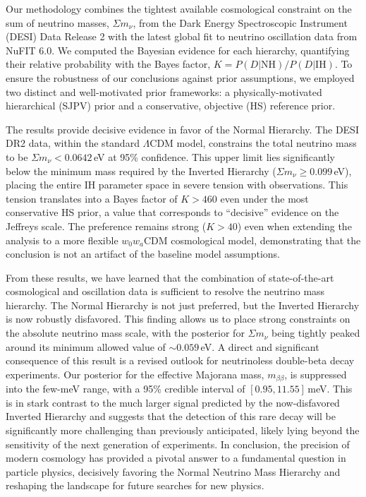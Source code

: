 \documentclass[]{article}
\begin{document}
Our methodology combines the tightest available cosmological constraint on the sum of neutrino masses, $\Sigma m_\nu$, from the Dark Energy Spectroscopic Instrument (DESI) Data Release 2 with the latest global fit to neutrino oscillation data from NuFIT 6.0. We computed the Bayesian evidence for each hierarchy, quantifying their relative probability with the Bayes factor, $K = P(D|\text{NH}) / P(D|\text{IH})$. To ensure the robustness of our conclusions against prior assumptions, we employed two distinct and well-motivated prior frameworks: a physically-motivated hierarchical (SJPV) prior and a conservative, objective (HS) reference prior.

The results provide decisive evidence in favor of the Normal Hierarchy. The DESI DR2 data, within the standard $\Lambda$CDM model, constrains the total neutrino mass to be $\Sigma m_\nu < 0.0642$\,eV at 95\% confidence. This upper limit lies significantly below the minimum mass required by the Inverted Hierarchy ($\Sigma m_\nu \ge 0.099$\,eV), placing the entire IH parameter space in severe tension with observations. This tension translates into a Bayes factor of $K > 460$ even under the most conservative HS prior, a value that corresponds to ``decisive'' evidence on the Jeffreys scale. The preference remains strong ($K > 40$) even when extending the analysis to a more flexible $w_0w_a$CDM cosmological model, demonstrating that the conclusion is not an artifact of the baseline model assumptions.

From these results, we have learned that the combination of state-of-the-art cosmological and oscillation data is sufficient to resolve the neutrino mass hierarchy. The Normal Hierarchy is not just preferred, but the Inverted Hierarchy is now robustly disfavored. This finding allows us to place strong constraints on the absolute neutrino mass scale, with the posterior for $\Sigma m_\nu$ being tightly peaked around its minimum allowed value of $\sim 0.059$\,eV. A direct and significant consequence of this result is a revised outlook for neutrinoless double-beta decay experiments. Our posterior for the effective Majorana mass, $m_{\beta\beta}$, is suppressed into the few-meV range, with a 95\% credible interval of $[0.95, 11.55]$\,meV. This is in stark contrast to the much larger signal predicted by the now-disfavored Inverted Hierarchy and suggests that the detection of this rare decay will be significantly more challenging than previously anticipated, likely lying beyond the sensitivity of the next generation of experiments. In conclusion, the precision of modern cosmology has provided a pivotal answer to a fundamental question in particle physics, decisively favoring the Normal Neutrino Mass Hierarchy and reshaping the landscape for future searches for new physics.


{}

\end{document}

